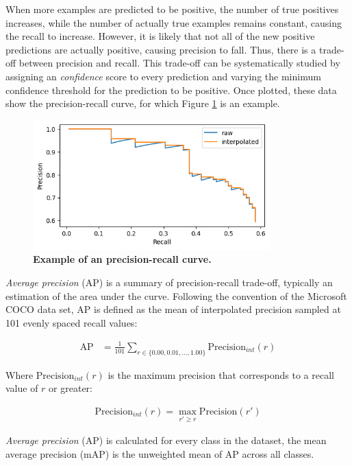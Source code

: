 \documentclass[12pt,a4paper,twoside,openany]{report}
\begin{document}
When more examples are predicted to be positive, the number of true positives increases, while the number of actually true examples remains constant, causing the recall to increase. However, it is likely that not all of the new positive predictions are actually positive, causing precision to fall. Thus, there is a trade-off between precision and recall. This trade-off can be systematically studied by assigning an \textit{confidence} score to every prediction and varying the minimum confidence threshold for the prediction to be positive. Once plotted, these data show the precision-recall curve, for which Figure \ref{fig:precision_recall} is an example.

\begin{figure}[h]
    \centering
    \includegraphics[height=5cm]{figs/eval/simple_mAP.png}
    \caption{\textbf{Example of an precision-recall curve.}}
    \label{fig:precision_recall}
\end{figure}

\textit{Average precision} (AP) is a summary of precision-recall trade-off, typically an estimation of the area under the curve. Following the convention of the Microsoft COCO \cite{lin_microsoft_2015} data set, AP is defined as the mean of interpolated precision sampled at 101 evenly spaced recall values:

\begin{align}
    \text{AP} &= \frac{1}{101} \sum\limits_{r\in \{0.00, 0.01, \dots, 1.00\}} \text{Precision}_{int}(r)
\end{align}

Where $\text{Precision}_{int}(r)$ is the maximum precision that corresponds to a recall value of $r$ or greater:

\begin{align}
    \text{Precision}_{int}(r) = \max\limits_{r' \geq r} \text{Precision}(r')
\end{align}

\textit{Average precision} (AP) is calculated for every class in the dataset, the mean average precision (mAP) is the unweighted mean of AP across all classes. 
\end{document}
